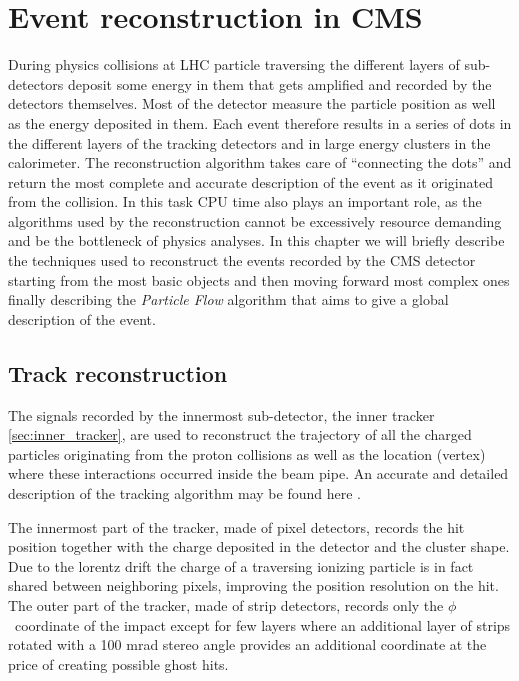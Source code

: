 \chapter{Event reconstruction in CMS}

During physics collisions at LHC particle traversing the different layers of sub-detectors deposit some energy in them that gets amplified and recorded by the detectors themselves. Most of the detector measure the particle position as well as the energy deposited in them. Each event therefore results in a series of dots in the different layers of the tracking detectors and in large energy clusters in the calorimeter. The reconstruction algorithm takes care of ``connecting the dots'' and return the most complete and accurate description of the event as it originated from the collision. In this task CPU time also plays an important role, as the algorithms used by the reconstruction cannot be excessively resource demanding and be the bottleneck of physics analyses. In this chapter we will briefly describe the techniques used to reconstruct the events recorded by the CMS detector starting from the most basic objects and then moving forward most complex ones finally describing the \emph{Particle Flow} algorithm that aims to give a global description of the event.

\section{Track reconstruction}

The signals recorded by the innermost sub-detector, the inner tracker \ref{sec:inner_tracker}, are used to reconstruct the trajectory of all the charged particles originating from the proton collisions as well as the location (vertex) where these interactions occurred inside the beam pipe. An accurate and detailed description of the tracking algorithm may be found here \cite{cms_trk_11_01}.

The innermost part of the tracker, made of pixel detectors, records the hit position together with the charge deposited in the detector and the cluster shape. Due to the lorentz drift the charge of a traversing ionizing particle is in fact shared between neighboring pixels, improving the position resolution on the hit. The outer part of the tracker, made of strip detectors, records only the $\phi$\ coordinate of the impact except for few layers where an additional layer of strips rotated with a 100 mrad stereo angle provides an additional coordinate at the price of creating possible ghost hits.

